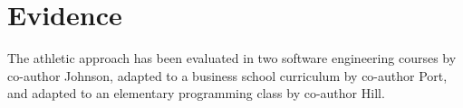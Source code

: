 \section{Evidence}

The athletic approach has been evaluated in two software engineering courses by co-author Johnson, adapted to a business school curriculum by co-author Port, and adapted to an elementary programming class by co-author Hill.  %




